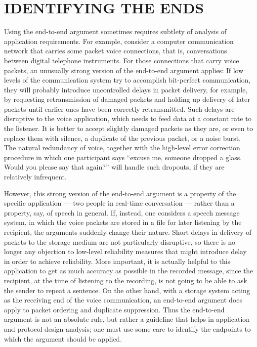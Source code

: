 \documentclass[a4paper,11pt,notitlepage,twoside,openright]{article}
\begin{document}
\hypertarget{identifying-the-ends}{%
\section{IDENTIFYING THE ENDS}\label{identifying-the-ends}}

Using the end-to-end argument sometimes requires subtlety of analysis of
application requirements. For example, consider a computer
communication network that carries some packet voice connections, that
is, conversations between digital telephone instruments. For those
connections that carry voice packets, an unusually strong version of
the end-to-end argument applies: If low levels of the communication
system try to accomplish bit-perfect communication, they will probably
introduce uncontrolled delays in packet delivery, for example, by requesting retransmission of damaged packets and holding up delivery of
later packets until earlier ones have been correctly retransmitted. Such
delays are disruptive to the voice application, which needs to feed data
at a constant rate to the listener. It is better to accept slightly
damaged packets as they are, or even to replace them with silence, a
duplicate of the previous packet, or a noise burst. The natural
redundancy of voice, together with the high-level error correction
procedure in which one participant says ``excuse me, someone dropped a
glass. Would you please say that again?'' will handle such dropouts, if
they are relatively infrequent.

However, this strong version of the end-to-end argument is a property of
the specific application --- two people in real-time conversation ---
rather than a property, say, of speech in general. If, instead, one
considers a speech message system, in which the voice packets are stored
in a file for later listening by the recipient, the arguments suddenly
change their nature. Short delays in delivery of packets to the storage
medium are not particularly disruptive, so there is no longer any
objection to low-level reliability measures that might introduce delay
in order to achieve reliability. More important, it is actually helpful
to this application to get as much accuracy as possible in the recorded
message, since the recipient, at the time of listening to the recording,
is not going to be able to ask the sender to repeat a sentence. On the
other hand, with a storage system acting as the receiving end of the
voice communication, an end-to-end argument does apply to packet
ordering and duplicate suppression. Thus the end-to-end argument is not
an absolute rule, but rather a guideline that helps in application and
protocol design analysis; one must use some care to identify the
endpoints to which the argument should be applied.
\end{document}

